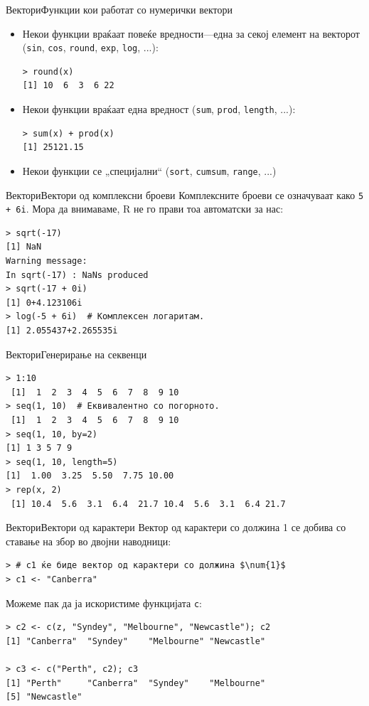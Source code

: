 \documentclass[hyperref={unicode}, xcolor={svgnames, table},
usepdftitle=false]{beamer}
\theoremstyle{remark}
\begin{document}
\begin{frame}[fragile]{Вектори}{Функции кои работат со нумерички вектори}
  \begin{itemize}
  \item Некои функции враќаат повеќе вредности---една за секој елемент на
    векторот (\texttt{sin}, \texttt{cos}, \texttt{round},
    \texttt{exp}, \texttt{log}, ...):
\begin{verbatim}
> round(x)
[1] 10  6  3  6 22
\end{verbatim}
  \item Некои функции враќаат една вредност (\texttt{sum},
    \texttt{prod}, \texttt{length}, ...):
\begin{verbatim}
> sum(x) + prod(x)
[1] 25121.15
\end{verbatim}
  \item Некои функции се „специјални“ (\texttt{sort},
    \texttt{cumsum}, \texttt{range}, ...)
  \end{itemize}
\end{frame}

\begin{frame}[fragile]{Вектори}{Вектори од комплексни броеви}
  Комплексните броеви се означуваат како \texttt{5 + 6i}.  Мора да
  внимаваме, R не го прави тоа автоматски за нас:
\begin{verbatim}
> sqrt(-17)
[1] NaN
Warning message:
In sqrt(-17) : NaNs produced
> sqrt(-17 + 0i)
[1] 0+4.123106i
> log(-5 + 6i)  # Комплексен логаритам.
[1] 2.055437+2.265535i
\end{verbatim}
\end{frame}

\begin{frame}[fragile]{Вектори}{Генерирање на секвенци}
\begin{verbatim}
> 1:10
 [1]  1  2  3  4  5  6  7  8  9 10
> seq(1, 10)  # Еквивалентно со погорното.
 [1]  1  2  3  4  5  6  7  8  9 10
> seq(1, 10, by=2)
[1] 1 3 5 7 9
> seq(1, 10, length=5)
[1]  1.00  3.25  5.50  7.75 10.00
> rep(x, 2)
 [1] 10.4  5.6  3.1  6.4  21.7 10.4  5.6  3.1  6.4 21.7
\end{verbatim}
\end{frame}

\begin{frame}[fragile]{Вектори}{Вектори од карактери}
  Вектор од карактери со должина \num{1} се добива со ставање на збор во двојни наводници:
\begin{verbatim}
> # c1 ќе биде вектор од карактери со должина $\num{1}$
> c1 <- "Canberra"
\end{verbatim}

  Можеме пак да ја искористиме функцијата \texttt{c}:
\begin{verbatim}
> c2 <- c(z, "Syndey", "Melbourne", "Newcastle"); c2
[1] "Canberra"  "Syndey"    "Melbourne" "Newcastle"

> c3 <- c("Perth", c2); c3
[1] "Perth"     "Canberra"  "Syndey"    "Melbourne"
[5] "Newcastle"
\end{verbatim}
\end{frame}
\end{document}
